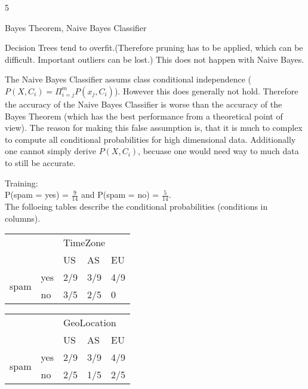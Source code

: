 \documentclass{article}
\begin{document}
    \begin{ukon-infie}[29.11.17]{5}

        \begin{exercise}[p=10]{Bayes Theorem, Naive Bayes Classifier}
       
       \question{}
       {
       Decision Trees tend to overfit.(Therefore pruning has to be applied, which can be difficult. Important outliers can be lost.) This does not happen with Naive Bayes.
       }
       
       \question{}
       {
       The Naive Bayes Classifier assums class conditional independence ($P(X, C_i) = \Pi_{i = j}^m P(x_j,C_i) $). However this does generally not hold. Therefore the accuracy of the Naive Bayes Classifier is worse than the accuracy of the Bayes Theorem (which has the best performance from a theoretical point of view). The reason for making this false assumption is, that it is much to complex to compute all conditional probabilities for high dimensional data. Additionally one cannot simply derive $P(X, C_i)$, becuase one would need way to much data to still be accurate.
       }
       
       \question{}
       {
       Training:\\
       P(spam = yes) = $\frac{9}{14}$ and P(spam = no) = $\frac{5}{14}$.\\
       The folloeing tables describe the conditional probabilities (conditions in columns).\\
\begin{tabular}{|l|l|l|l|l|}
\hline
\multicolumn{2}{|l|}{\multirow{2}{*}{}} & \multicolumn{3}{l|}{TimeZone} \\ \cline{3-5} 
\multicolumn{2}{|l|}{}                  & US       & AS       & EU      \\ \hline
\multirow{2}{*}{spam}       & yes       & 2/9      & 3/9      & 4/9     \\ \cline{2-5} 
                            & no        & 3/5      & 2/5      & 0       \\ \hline
\end{tabular}
\begin{tabular}{|l|l|l|l|l|}
\hline
\multicolumn{2}{|l|}{\multirow{2}{*}{}} & \multicolumn{3}{l|}{GeoLocation} \\ \cline{3-5} 
\multicolumn{2}{|l|}{}                  & US        & AS        & EU       \\ \hline
\multirow{2}{*}{spam}       & yes       & 2/9       & 3/9       & 4/9      \\ \cline{2-5} 
                            & no        & 2/5       & 1/5       & 2/5      \\ \hline
\end{tabular}
\\

}
\end{exercise}
\end{ukon-infie}
\end{document}
